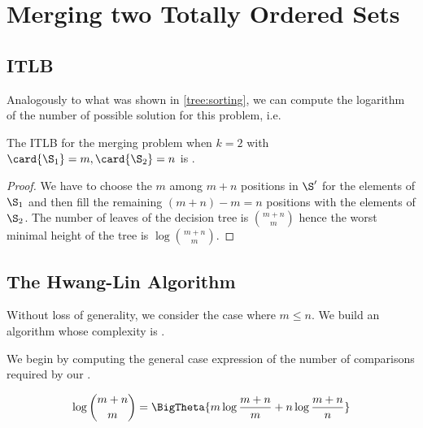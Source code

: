 \section{Merging two Totally Ordered Sets}
\label{tree:merging:k=2}

\subsection*{ITLB}
\label{tree:merging:k=2:ITLB}

Analogously to what was shown in \ref{tree:sorting}, we can compute the
logarithm of the number of possible solution for this problem, i.e.

\begin{theorem}
The ITLB for the merging problem when \(k = 2\) with \(\card{\S_1} = m, \card{\S_2}
= n\) is .
\end{theorem}

\begin{proof}
We have to choose the $m$ among $m+n$ positions in $\S'$ for the elements of
$\S_1$ and then fill the remaining $(m+n) - m = n$ positions with the elements
of $\S_2$. The number of leaves of the decision tree is $\binom{m+n}{m}$ hence
the worst minimal height of the tree is $\log \binom{m+n}{m}$.
\end{proof}



\subsection*{The Hwang-Lin Algorithm}
\label{tree:merging:k=2:alg}

Without loss of generality, we consider the case where \(m \leq n\). We build an
algorithm whose complexity is .

We begin by computing the general case expression of the number of comparisons
required by our .

\begin{lemma}
\begin{align*}
\log\binom{m+n}{m} &= \BigTheta{m \log\frac{m+n}{m} + n \log\frac{m+n}{n}}\\
\end{align*}
\end{lemma}

